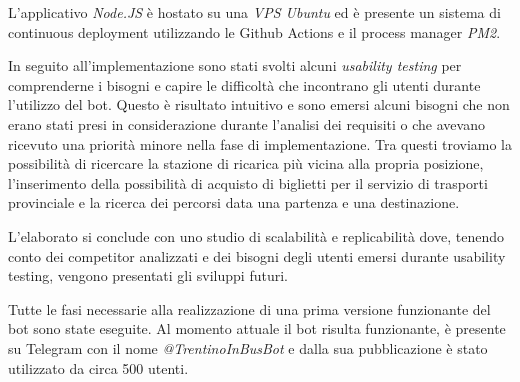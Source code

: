L'applicativo \textit{Node.JS} è hostato su una \textit{VPS Ubuntu} ed è presente un sistema di continuous deployment utilizzando le Github Actions e il process manager \textit{PM2}.

In seguito all'implementazione sono stati svolti alcuni \textit{usability testing} per comprenderne i bisogni e capire le difficoltà che incontrano gli utenti durante l'utilizzo del bot. Questo è risultato intuitivo e sono emersi alcuni bisogni che non erano stati presi in considerazione durante l'analisi dei requisiti o che avevano ricevuto una priorità minore nella fase di implementazione. Tra questi troviamo la possibilità di ricercare la stazione di ricarica più vicina alla propria posizione,  l’inserimento della possibilità di acquisto di biglietti per il servizio di trasporti provinciale e la ricerca dei percorsi data una partenza e una destinazione. 

L'elaborato si conclude con uno studio di scalabilità e replicabilità dove, tenendo conto dei competitor analizzati e dei bisogni degli utenti emersi durante usability testing, vengono presentati gli sviluppi futuri.

Tutte le fasi necessarie alla realizzazione di una prima versione funzionante del bot sono state eseguite. Al momento attuale il bot risulta funzionante, è presente su Telegram con il nome \textit{@TrentinoInBusBot} e dalla sua pubblicazione è stato utilizzato da circa 500 utenti. 




%





